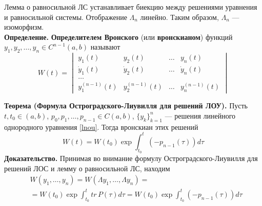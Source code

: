 Лемма о равносильной ЛС устанавливает биекцию между решениями уравнения и равносильной системы. Отображение $\Lambda_n$ линейно. Таким образом, $\Lambda_n$ --- изоморфизм.\\

\noindent \textbf{Определение.} \textbf{Определителем Вронского} (или \textbf{вронскианом}) функций $y_1, y_2, \ldots, y_n \in C^{n-1}(a,b)$ называют
\begin{equation*}
    W(t) = \begin{vmatrix}
        y_1(t)         & y_2(t)         & \ldots & y_n(t)         \\
        \dot{y}_1(t)   & \dot{y}_2(t)   & \ldots & \dot{y}_n(t)   \\
        \ldots                                                    \\
        y_1^{(n-1)}(t) & y_2^{(n-1)}(t) & \ldots & y_n^{(n-1)}(t)
    \end{vmatrix}
\end{equation*}

\noindent \textbf{Теорема (Формула Остроградского-Лиувилля для решений ЛОУ).} Пусть $t, t_0 \in (a,b)$, $p_0, p_1, \ldots, p_{n-1} \in C(a,b)$, $\{y_k\}_{k=1}^n$ --- решения линейного однородного уравнения \eqref{lnou}. Тогда вронскиан этих решений
\begin{equation*}
    W(t) = W(t_0)\exp \int_{t_0}^t (-p_{n-1}(\tau))d\tau
\end{equation*}
\textbf{Доказательство.} Принимая во внимание формулу Остроградского-Лиувилля для решений ЛОС и лемму о равносильной ЛС, находим
\begin{equation*}
    \begin{aligned}
         & W(y_1,\ldots, y_n) = W(\Lambda y_1,\ldots, \Lambda y_n) =                                  \\
         & = W(t_0)\exp \int_{t_0}^t tr\,P(\tau)d\tau = W(t_0)\exp \int_{t_0}^t (-p_{n-1}(\tau))d\tau
    \end{aligned}
\end{equation*}

